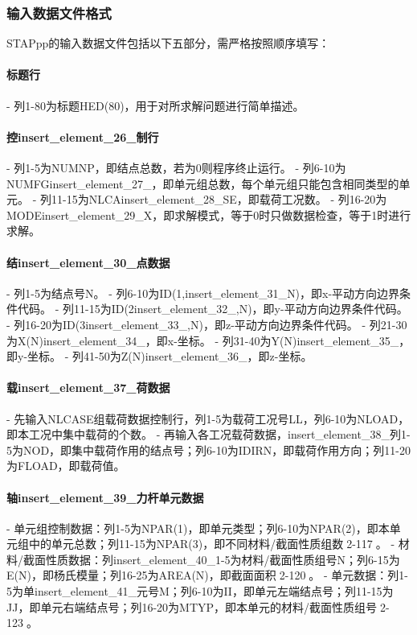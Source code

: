 \documentclass{article}
\begin{document}
\subsubsection{输入数据文件格式}
STAPpp的输入数据文件包括以下五部分，需严格按照顺序填写：

\paragraph{标题行}
- 列1-80为标题HED(80)，用于对所求解问题进行简单描述。

\paragraph{控{insert\_element\_26\_}制行}
- 列1-5为NUMNP，即结点总数，若为0则程序终止运行。
- 列6-10为NUMFG{insert\_element\_27\_}，即单元组总数，每个单元组只能包含相同类型的单元。
- 列11-15为NLCA{insert\_element\_28\_}SE，即载荷工况数。
- 列16-20为MODE{insert\_element\_29\_}X，即求解模式，等于0时只做数据检查，等于1时进行求解。

\paragraph{结{insert\_element\_30\_}点数据}
- 列1-5为结点号N。
- 列6-10为ID(1,{insert\_element\_31\_}N)，即x-平动方向边界条件代码。
- 列11-15为ID(2{insert\_element\_32\_},N)，即y-平动方向边界条件代码。
- 列16-20为ID(3{insert\_element\_33\_},N)，即z-平动方向边界条件代码。
- 列21-30为X(N){insert\_element\_34\_}，即x-坐标。
- 列31-40为Y(N){insert\_element\_35\_}，即y-坐标。
- 列41-50为Z(N){insert\_element\_36\_}，即z-坐标。

\paragraph{载{insert\_element\_37\_}荷数据}
- 先输入NLCASE组载荷数据控制行，列1-5为载荷工况号LL，列6-10为NLOAD，即本工况中集中载荷的个数。
- 再输入各工况载荷数据，{insert\_element\_38\_}列1-5为NOD，即集中载荷作用的结点号；列6-10为IDIRN，即载荷作用方向；列11-20为FLOAD，即载荷值。

\paragraph{轴{insert\_element\_39\_}力杆单元数据}
- 单元组控制数据：列1-5为NPAR(1)，即单元类型；列6-10为NPAR(2)，即本单元组中的单元总数；列11-15为NPAR(3)，即不同材料/截面性质组数🔶2-117🔶。
- 材料/截面性质数据：列{insert\_element\_40\_}1-5为材料/截面性质组号N；列6-15为E(N)，即杨氏模量；列16-25为AREA(N)，即截面面积🔶2-120🔶。
- 单元数据：列1-5为单{insert\_element\_41\_}元号M；列6-10为II，即单元左端结点号；列11-15为JJ，即单元右端结点号；列16-20为MTYP，即本单元的材料/截面性质组号🔶2-123🔶。
\end{document}

